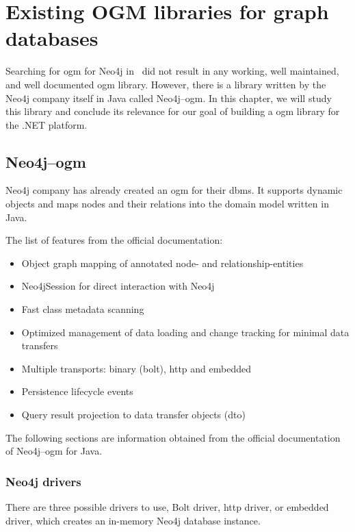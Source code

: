 \chapter {Existing OGM libraries for graph databases}

Searching for \acrshort{ogm} for Neo4j in \CS\ did not result in any working, well maintained, and well documented \acrshort{ogm} library.
However, there is a library written by the Neo4j company itself in Java called Neo4j--\acrshort{ogm}.
In this chapter, we will study this library and conclude its relevance for our goal of building a \acrshort{ogm} library for the .NET platform.

\section{Neo4j--\acrshort{ogm}}

Neo4j company has already created an \acrshort{ogm} for their \acrshort{dbms}.
It supports dynamic objects and maps nodes and their relations into the domain model written in Java.

The list of features from the official documentation: \cite{neo4j_neo4j_nodate}
\begin{itemize}
	\item Object graph mapping of annotated node- and relationship-entities
	\item Neo4jSession for direct interaction with Neo4j
	\item Fast class metadata scanning
	\item Optimized management of data loading and change tracking for minimal data transfers
	\item Multiple transports: binary (bolt), \acrshort{http} and embedded
	\item Persistence lifecycle events
	\item Query result projection to data transfer objects (\acrshort{dto})
\end{itemize}

The following sections are information obtained from the official documentation of Neo4j--\acrshort{ogm} for Java. \cite{neo4j_reference_nodate}

\subsection {Neo4j drivers}

There are three possible drivers to use, Bolt driver, \acrshort{http} driver, or embedded driver, which creates an in-memory Neo4j database instance.

